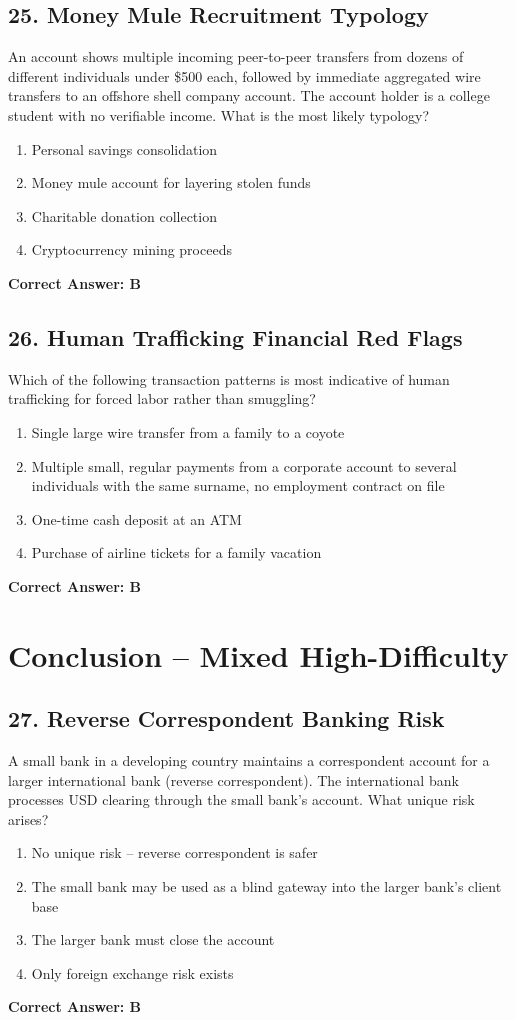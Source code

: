 \documentclass[11pt,a4paper]{article}
\begin{document}
	\subsection{25. Money Mule Recruitment Typology}
	An account shows multiple incoming peer-to-peer transfers from dozens of different individuals under \$500 each, followed by immediate aggregated wire transfers to an offshore shell company account. The account holder is a college student with no verifiable income. What is the most likely typology?
	\begin{enumerate}[label=\Alph*.]
		\item Personal savings consolidation
		\item Money mule account for layering stolen funds
		\item Charitable donation collection
		\item Cryptocurrency mining proceeds
	\end{enumerate}
	\textbf{Correct Answer: B}
	
	\subsection{26. Human Trafficking Financial Red Flags}
	Which of the following transaction patterns is most indicative of human trafficking for forced labor rather than smuggling?
	\begin{enumerate}[label=\Alph*.]
		\item Single large wire transfer from a family to a coyote
		\item Multiple small, regular payments from a corporate account to several individuals with the same surname, no employment contract on file
		\item One-time cash deposit at an ATM
		\item Purchase of airline tickets for a family vacation
	\end{enumerate}
	\textbf{Correct Answer: B}
	
	\section{Conclusion – Mixed High-Difficulty}
	
	\subsection{27. Reverse Correspondent Banking Risk}
	A small bank in a developing country maintains a correspondent account for a larger international bank (reverse correspondent). The international bank processes USD clearing through the small bank’s account. What unique risk arises?
	\begin{enumerate}[label=\Alph*.]
		\item No unique risk – reverse correspondent is safer
		\item The small bank may be used as a blind gateway into the larger bank’s client base
		\item The larger bank must close the account
		\item Only foreign exchange risk exists
	\end{enumerate}
	\textbf{Correct Answer: B}
	
\end{document}
